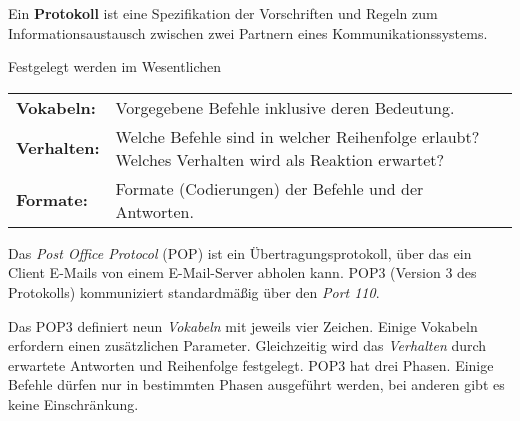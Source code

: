 \documentclass[10pt, a4paper]{arbeitsblatt}
\begin{document}
\ReiheTitel

\begin{infobox}
Ein \textbf{Protokoll} ist eine Spezifikation der Vorschriften und Regeln zum Informationsaustausch zwischen zwei Partnern eines Kommunikationssystems.

Festgelegt werden im Wesentlichen

\begin{tabularx}{\textwidth}{lX}
	\textbf{Vokabeln:} & Vorgegebene Befehle inklusive deren Bedeutung. \\
	\textbf{Verhalten:} & Welche Befehle sind in welcher Reihenfolge erlaubt? Welches Verhalten wird als Reaktion erwartet?  \\
	\textbf{Formate:} & Formate (Codierungen) der Befehle und der Antworten.
\end{tabularx}
\end{infobox}

\vspace*{-1em}
Das \emph{Post Office Protocol} (POP) ist ein Übertragungsprotokoll, über das ein Client E-Mails von einem E-Mail-Server abholen kann. POP3 (Version 3 des Protokolls) kommuniziert standardmäßig über den \emph{Port 110}.

Das POP3 definiert neun \emph{Vokabeln} mit jeweils vier Zeichen. Einige Vokabeln erfordern einen zusätzlichen Parameter. Gleichzeitig wird das \emph{Verhalten} durch erwartete Antworten und Reihenfolge festgelegt. POP3 hat drei Phasen. Einige Befehle dürfen nur in bestimmten Phasen ausgeführt werden, bei anderen gibt es keine Einschränkung.
\end{document}
